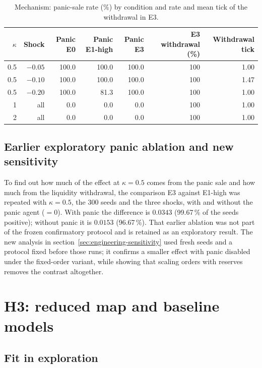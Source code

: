 \begin{table}[htbp]
\centering
\caption{Mechanism: panic-sale rate (\%) by condition and rate and mean tick of the withdrawal in E3.}
\label{tab:mecanismo}
\small
\begin{tabular}{@{}rrrrrrr@{}}
\toprule
$\kappa$ & Shock & Panic E0 & Panic E1-high & Panic E3 & E3 withdrawal (\%) & Withdrawal tick \\
\midrule
0.5 & $-0.05$ & 100.0 & 100.0 & 100.0 & 100 & 1.00 \\
0.5 & $-0.10$ & 100.0 & 100.0 & 100.0 & 100 & 1.47 \\
0.5 & $-0.20$ & 100.0 & 81.3 & 100.0 & 100 & 1.00 \\
1 & all & 0.0 & 0.0 & 0.0 & 100 & 1.00 \\
2 & all & 0.0 & 0.0 & 0.0 & 100 & 1.00 \\
\bottomrule
\end{tabular}
\end{table}

\subsection{Earlier exploratory panic ablation and new sensitivity}

To find out how much of the effect at $\kappa=0.5$ comes from the panic sale and how much from the liquidity withdrawal, the comparison E3 against E1-high was repeated with $\kappa=0.5$, the 300 seeds and the three shocks, with and without the panic agent ($=0$). With panic the difference is $0.0343$ (99.67\,\% of the seeds positive); without panic it is $0.0153$ (96.67\,\%). That earlier ablation was not part of the frozen confirmatory protocol and is retained as an exploratory result. The new analysis in section~\ref{sec:engineering-sensitivity} used fresh seeds and a protocol fixed before those runs; it confirms a smaller effect with panic disabled under the fixed-order variant, while showing that scaling orders with reserves removes the contrast altogether.

\section{H3: reduced map and baseline models}
\label{sec:res-h3}

\subsection{Fit in exploration}

